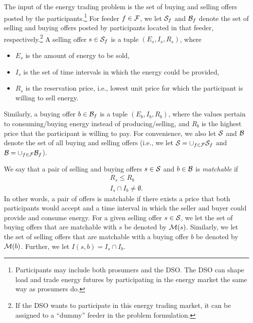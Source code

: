 The input of the energy trading problem is the set of buying and selling offers posted by the participants.\footnote{Participants may include both prosumers and the DSO. The DSO can shape load and trade energy futures by participating in the energy market the same way as prosumers do.}
%
For feeder $f \in \mathcal{F}$, we let $\mathcal{S}_f$ and $\mathcal{B}_f$ denote the set of selling and buying offers posted by participants located in that feeder, respectively.\footnote{If the DSO wants to participate in this energy trading market, it can be assigned to a ``dummy'' feeder in the problem formulation.} 
A selling offer $s \in \mathcal{S}_f$ is a tuple $\left(E_s, I_s, R_s\right)$, where
\begin{itemize}
\item $E_s$ is the amount of energy to be sold,
\item $I_s$ is the set of time intervals in which the energy could be provided,
\item $R_s$ is the reservation price, i.e., lowest unit price for which the participant is willing to sell energy. %
\end{itemize}
Similarly, a buying offer $b \in \mathcal{B}_f$ is a tuple $\left(E_b, I_b, R_b\right)$, where the values pertain to consuming/buying energy instead of producing/selling, and $R_b$ is the highest price that the participant is willing to pay.
For convenience, we also let $\mathcal{S}$ and $\mathcal{B}$ denote the set of all buying and selling offers (i.e., we let $\mathcal{S} = \cup_{f \in \mathcal{F}} \mathcal{S}_f$ and $\mathcal{B} = \cup_{f \in \mathcal{F}} \mathcal{B}_f$).

We say that a pair of selling and buying offers $s \in \mathcal{S}$ and $b \in \mathcal{B}$ is \emph{matchable} if
\begin{align}
R_s \leq R_b \\
I_s \cap I_b \neq \emptyset .
\end{align}
In other words, a pair of offers is matchable if there exists a price that both participants would accept and a time interval in which the seller and buyer could provide and consume energy.
For a given selling offer $s \in \mathcal{S}$,
we let the set of buying offers that are matchable with $s$ be denoted by $\mathcal{M}(s)$.
Similarly, we let the set of selling offers that are matchable with a buying offer $b$ be denoted by $\mathcal{M}(b)$.
Further, we let $I(s, b) = I_s \cap I_b$.

